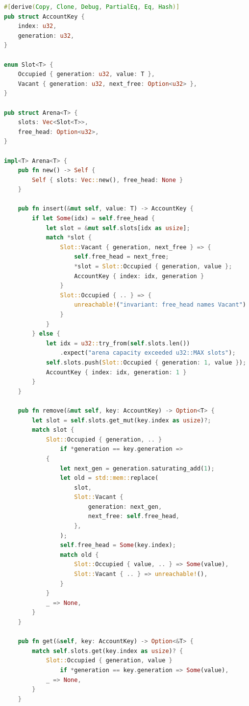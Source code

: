 \begin{lstlisting}[language=Rust]
#[derive(Copy, Clone, Debug, PartialEq, Eq, Hash)]
pub struct AccountKey {
    index: u32,
    generation: u32,
}

enum Slot<T> {
    Occupied { generation: u32, value: T },
    Vacant { generation: u32, next_free: Option<u32> },
}

pub struct Arena<T> {
    slots: Vec<Slot<T>>,
    free_head: Option<u32>,
}

impl<T> Arena<T> {
    pub fn new() -> Self {
        Self { slots: Vec::new(), free_head: None }
    }

    pub fn insert(&mut self, value: T) -> AccountKey {
        if let Some(idx) = self.free_head {
            let slot = &mut self.slots[idx as usize];
            match *slot {
                Slot::Vacant { generation, next_free } => {
                    self.free_head = next_free;
                    *slot = Slot::Occupied { generation, value };
                    AccountKey { index: idx, generation }
                }
                Slot::Occupied { .. } => {
                    unreachable!("invariant: free_head names Vacant")
                }
            }
        } else {
            let idx = u32::try_from(self.slots.len())
                .expect("arena capacity exceeded u32::MAX slots");
            self.slots.push(Slot::Occupied { generation: 1, value });
            AccountKey { index: idx, generation: 1 }
        }
    }

    pub fn remove(&mut self, key: AccountKey) -> Option<T> {
        let slot = self.slots.get_mut(key.index as usize)?;
        match slot {
            Slot::Occupied { generation, .. }
                if *generation == key.generation =>
            {
                let next_gen = generation.saturating_add(1);
                let old = std::mem::replace(
                    slot,
                    Slot::Vacant {
                        generation: next_gen,
                        next_free: self.free_head,
                    },
                );
                self.free_head = Some(key.index);
                match old {
                    Slot::Occupied { value, .. } => Some(value),
                    Slot::Vacant { .. } => unreachable!(),
                }
            }
            _ => None,
        }
    }

    pub fn get(&self, key: AccountKey) -> Option<&T> {
        match self.slots.get(key.index as usize)? {
            Slot::Occupied { generation, value }
                if *generation == key.generation => Some(value),
            _ => None,
        }
    }


\end{lstlisting}
